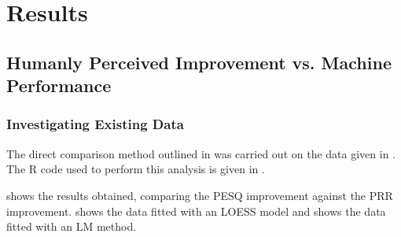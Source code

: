 
\chapter{Results}

\acresetall


\section{Humanly Perceived Improvement vs. Machine Performance}


\subsection{Investigating Existing Data}

The direct comparison method outlined in 
was carried out on the data given in  \textit{}.
The R code used to perform this analysis is given in .

 shows the results obtained, comparing the
\ac{PESQ} improvement against the \ac{PRR} improvement. 
shows the data fitted with an \ac{LOESS} model and 
shows the data fitted with an \ac{LM} method.

